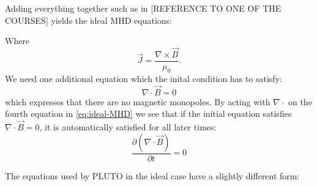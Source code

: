 Adding everything together such as in [REFERENCE TO ONE OF THE COURSES] yields the ideal MHD equations:

{\centering 
\noindent {}
\par}

Where $$\vec{J} = \frac{\nabla\times \vec{B}}{\mu_0}. $$ We need one additional equation which the inital condition has to satisfy:
\begin{equation*}
	\nabla\cdot\vec{B}=0
\end{equation*}
which expresses that there are no magnetic monopoles. By acting with $\nabla\cdot$ on the fourth equation in \cref{eq:ideal-MHD} we see that if the initial equation satisfies $\nabla\cdot\vec{B}=0$, it is automatically satisfied for all later times:
\begin{equation*}
	\frac{\partial (\nabla\cdot\vec{B})}{\partial t} = 0
\end{equation*}

The equations used by PLUTO in the ideal case have a slightly different form: 

{\centering 
\noindent {}
\par}

